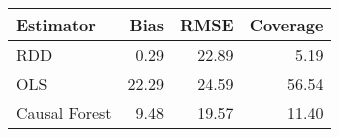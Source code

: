 \begin{table}[ht]
\centering
\begin{tabular}{lrrr}
  \hline
Estimator & Bias & RMSE & Coverage \\ 
  \hline
RDD & 0.29 & 22.89 & 5.19 \\ 
  OLS & 22.29 & 24.59 & 56.54 \\ 
  Causal Forest & 9.48 & 19.57 & 11.40 \\ 
   \hline
\end{tabular}
\end{table}
